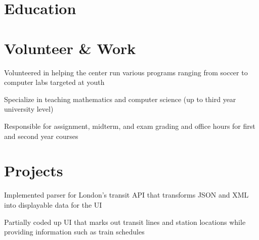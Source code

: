 \documentclass[]{deedy-resume-openfont}
\begin{document}
~\\~\\

\section{Education}
\sectionsep

\section{Volunteer \& Work}
\vspace{\topsep}
\begin{tightemize}
\item Volunteered in helping the center run various programs ranging from soccer to computer labs targeted at youth
\end{tightemize}
\sectionsep

\descript{}
\begin{tightemize}
\item Specialize in teaching mathematics and computer science (up to third year university level)
\end{tightemize}
\sectionsep

\begin{tightemize}
\item Responsible for assignment, midterm, and exam grading and office hours for first and second year courses
\end{tightemize}
\sectionsep

\section{Projects}

\begin{tightemize}
\item Implemented parser for London's transit API that transforms JSON and XML into displayable data for the UI
\item Partially coded up UI that marks out transit lines and station locations while providing information such as train schedules
\end{tightemize}
\sectionsep
\end{document}
